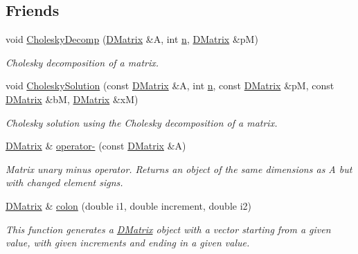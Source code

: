 \subsection*{Friends}
\begin{DoxyCompactItemize}
\item 
void \hyperlink{classDMatrix_ae96d9db92ff5e3a72e0e7b0eda05490f}{CholeskyDecomp} (\hyperlink{classDMatrix}{DMatrix} \&A, int \hyperlink{classDMatrix_a6b7668991ff7d01230b3599836a5d682}{n}, \hyperlink{classDMatrix}{DMatrix} \&pM)
\begin{DoxyCompactList}\small\item\em Cholesky decomposition of a matrix. \item\end{DoxyCompactList}\item 
void \hyperlink{classDMatrix_ac66ec50116a7b447a9ba3d0cc38043eb}{CholeskySolution} (const \hyperlink{classDMatrix}{DMatrix} \&A, int \hyperlink{classDMatrix_a6b7668991ff7d01230b3599836a5d682}{n}, const \hyperlink{classDMatrix}{DMatrix} \&pM, const \hyperlink{classDMatrix}{DMatrix} \&bM, \hyperlink{classDMatrix}{DMatrix} \&xM)
\begin{DoxyCompactList}\small\item\em Cholesky solution using the Cholesky decomposition of a matrix. \item\end{DoxyCompactList}\item 
\hyperlink{classDMatrix}{DMatrix} \& \hyperlink{classDMatrix_ac100c02f140686e07a7b520bf5a58e25}{operator-\/} (const \hyperlink{classDMatrix}{DMatrix} \&A)
\begin{DoxyCompactList}\small\item\em Matrix unary minus operator. Returns an object of the same dimensions as A but with changed element signs. \item\end{DoxyCompactList}\item 
\hyperlink{classDMatrix}{DMatrix} \& \hyperlink{classDMatrix_ab52a3e622e1d9bab78e860842f5dd983}{colon} (double i1, double increment, double i2)
\begin{DoxyCompactList}\small\item\em This function generates a \hyperlink{classDMatrix}{DMatrix} object with a vector starting from a given value, with given increments and ending in a given value. \item\end{DoxyCompactList}\item 

\end{DoxyCompactItemize}
